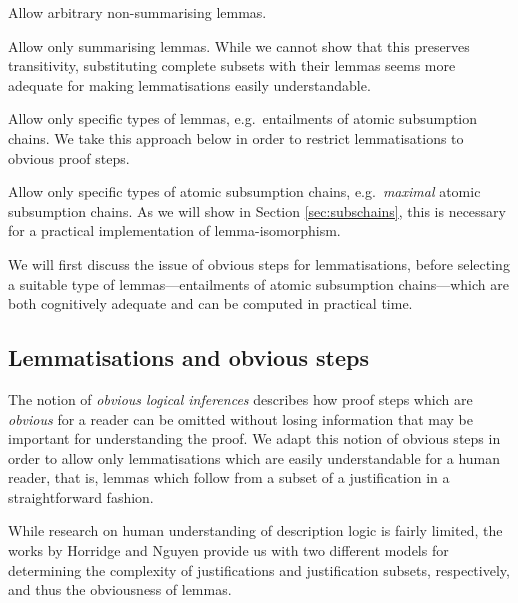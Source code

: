 \begin{compactenum}
\item Allow arbitrary non-summarising lemmas.
\item Allow only summarising lemmas. While we cannot show that this preserves transitivity, substituting complete subsets with their lemmas seems more adequate for making lemmatisations easily understandable. 
\item Allow only specific types of lemmas, e.g.\ entailments of atomic subsumption chains. We take this approach below in order to restrict lemmatisations to obvious proof steps.
\item Allow only specific types of atomic subsumption chains, e.g.\ \emph{maximal} atomic subsumption chains. As we will show in Section \ref{sec:subschains}, this is necessary for a practical implementation of lemma-isomorphism.
\end{compactenum}

We will first discuss the issue of obvious steps for lemmatisations, before selecting a suitable type of lemmas---entailments of atomic subsumption chains---which are both cognitively adequate and can be computed in practical time.


\subsection{Lemmatisations and obvious steps}
\label{sec:obvious} 

The notion of \emph{obvious logical inferences} \cite{davis81sz} describes how proof steps which are \emph{obvious} for a reader can be omitted without losing information that may be important for understanding the proof. We adapt this notion of obvious steps in order to allow only lemmatisations which are easily understandable for a human reader, that is, lemmas which follow from a subset of a justification in a straightforward fashion.

While research on human understanding of description logic is fairly limited, the works by Horridge \cite{horridge11gj} and Nguyen \cite{nguyen12ab} provide us with two different models for determining the complexity of justifications and justification subsets, respectively, and thus the obviousness of lemmas.


